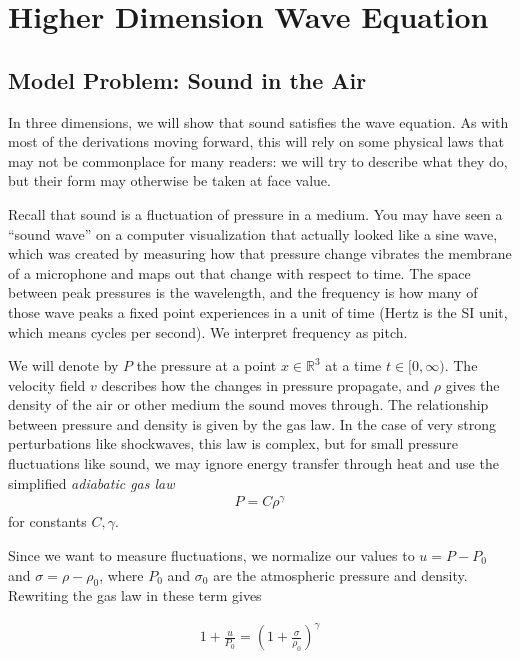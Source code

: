 \documentclass{article}
\newcommand{\R}{{\mathbb{R}}}
\begin{document}
	
	
	
	
	\section{Higher Dimension Wave Equation}
	
	\subsection{Model Problem: Sound in the Air}
	
	In three dimensions, we will show that sound satisfies the wave equation. As with most of the derivations moving forward, this will rely on some physical laws that may not be commonplace for many readers: we will try to describe what they do, but their form may otherwise be taken at face value. 
	
	Recall that sound is a fluctuation of pressure in a medium. You may have seen a ``sound wave'' on a computer visualization that actually looked like a sine wave, which was created by measuring how that pressure change vibrates the membrane of a microphone and maps out that change with respect to time. The space between peak pressures is the wavelength, and the frequency is how many of those wave peaks a fixed point experiences in a unit of time (Hertz is the SI unit, which means cycles per second). We interpret frequency as pitch. 
	
	We will denote by $P$ the pressure at a point $x \in \R^{3}$ at a time $t \in [ 0,\infty)$. The velocity field $v$ describes how the changes in pressure propagate, and $\rho$ gives the density of the air or other medium the sound moves through. The relationship between pressure and density is given by the gas law. In the case of very strong perturbations like shockwaves, this law is complex, but for small pressure fluctuations like sound, we may ignore energy transfer through heat and use the simplified \textit{adiabatic gas law}
	\begin{align*}
		P = C \rho^{\gamma}
	\end{align*}
	for constants $C,\gamma$. 
	
	Since we want to measure fluctuations, we normalize our values to $u = P - P_0$ and $\sigma = \rho - \rho_0$, where $P_0$ and $\sigma_0$ are the atmospheric pressure and density. Rewriting the gas law in these term gives
	
	\begin{align*}
		1 + \frac{u}{P_0} = \left( 1 + \frac{\sigma}{\rho_0} \right)^{\gamma}
	\end{align*}
	
\end{document}

